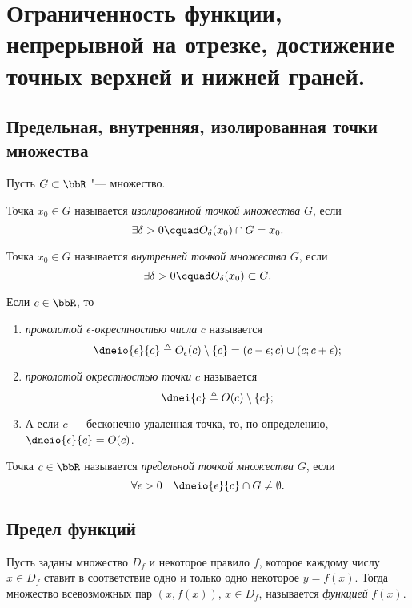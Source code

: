 \chapter{Ограниченность функции, непрерывной на отрезке, достижение точных верхней и нижней граней.}

\section{Предельная, внутренняя, изолированная точки множества}
Пусть $G \subset \bbR$ "--- множество.
\begin{defn}
Точка $x_0 \in G$ называется \textit{изолированной точкой множества} $G$, если $$\exists \delta >0\cquad  O_\delta(x_0) \cap G = x_0.$$
\end{defn}

\begin{defn}
Точка $x_0 \in G$ называется \textit{внутренней точкой множества} $G$, если $$\exists \delta >0\cquad O_\delta(x_0) \subset G.$$
\end{defn}

\begin{defn}
Если $c \in \bbR$, то 
\begin{enumerate}[wide, labelwidth=!, labelindent=0pt, nolistsep]
\item
\textit{проколотой $\epsilon$-окрестностью числа} $c$ называется $$\dneio{\epsilon}{c} \triangleq O_\epsilon(c)\setminus\{c\}=(c-\epsilon;c)\cup(c;c+\epsilon);$$
\item
\textit{проколотой окрестностью точки} $c$ называется $$\dnei{c} \triangleq O(c)\setminus \{c\};$$
\item[\textbullet]
А если $c$ --- бесконечно удаленная точка, то, по определению, $\dneio{\epsilon}{c}= O (c) $.
\end{enumerate}
\end{defn}

\begin{defn}
Точка $c \in \bbR$ называется \textit{предельной точкой множества} $G$, если $$\forall \epsilon >0 \quad \dneio{\epsilon}{c} \cap G \ne \emptyset.$$
\end{defn}

\section{Предел функций}
\begin{defn}
Пусть заданы множество $D_f$ и некоторое правило $f$, которое каждому числу $x\in D_f$ ставит в соответствие одно и только одно некоторое $y=f(x)$. Тогда множество всевозможных пар $(x, f(x))$, $x\in D_f$, называется \textit{функцией} $f(x)$.
\end{defn}

